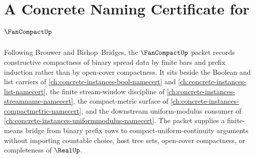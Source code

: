 \chapter{A Concrete Naming Certificate for $\FanCompactUp$}
\label{ch:concrete-instances-fan-compact-namecert}

Following Brouwer and Bishop--Bridges, the $\FanCompactUp$ packet records constructive compactness of binary spread data by finite bars and prefix induction rather than by open-cover compactness. It sits beside the Boolean and list carriers of \autoref{ch:concrete-instances-bool-namecert} and \autoref{ch:concrete-instances-list-namecert}, the finite stream-window discipline of \autoref{ch:concrete-instances-streamname-namecert}, the compact-metric surface of \autoref{ch:concrete-instances-compactmetric-namecert}, and the downstream uniform-modulus consumer of \autoref{ch:concrete-instances-uniformmodulus-namecert}. The packet supplies a finite-means bridge from binary prefix rows to compact-uniform-continuity arguments without importing countable choice, host tree sets, open-cover compactness, or completeness of $\RealUp$.

